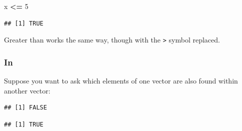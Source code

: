 \documentclass[]{book}
\newenvironment{Shaded}{\begin{snugshade}}{\end{snugshade}}
\newcommand{\KeywordTok}[1]{\textcolor[rgb]{0.13,0.29,0.53}{\textbf{#1}}}
\newcommand{\DecValTok}[1]{\textcolor[rgb]{0.00,0.00,0.81}{#1}}
\newcommand{\StringTok}[1]{\textcolor[rgb]{0.31,0.60,0.02}{#1}}
\newcommand{\CommentTok}[1]{\textcolor[rgb]{0.56,0.35,0.01}{\textit{#1}}}
\newcommand{\OperatorTok}[1]{\textcolor[rgb]{0.81,0.36,0.00}{\textbf{#1}}}
\newcommand{\NormalTok}[1]{#1}
\theoremstyle{definition}
\theoremstyle{definition}
\theoremstyle{definition}
\theoremstyle{remark}
\begin{document}
\begin{Shaded}
\begin{Highlighting}[]
\NormalTok{x }\OperatorTok{<=}\StringTok{ }\DecValTok{5}
\end{Highlighting}
\end{Shaded}

\begin{verbatim}
## [1] TRUE
\end{verbatim}

Greater than works the same way, though with the \texttt{\textgreater{}}
symbol replaced.

\subsubsection*{In}\label{in}

Suppose you want to ask which elements of one vector are also found
within another vector:

\begin{Shaded}
\end{Shaded}

\begin{verbatim}
## [1] FALSE
\end{verbatim}

\begin{Shaded}
\end{Shaded}

\begin{verbatim}
## [1] TRUE
\end{verbatim}

\begin{Shaded}
\end{Shaded}
\end{document}
